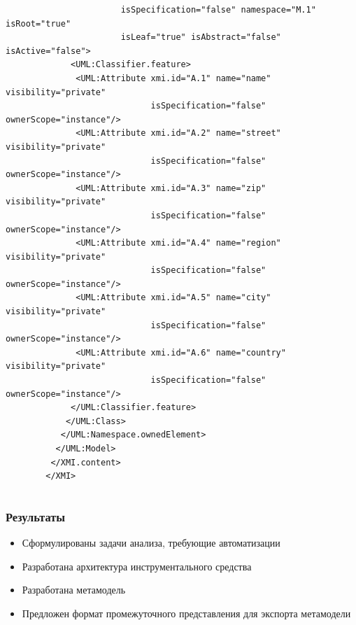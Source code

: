 \documentclass{beamer}
\begin{document}
\begin{frame}[fragile]
\begin{columns}
\begin{column}[c]{0.8\textwidth}
\begin{adjustbox}{width=0.8\textwidth,keepaspectratio}
\begin{lstlisting}
                       isSpecification="false" namespace="M.1" isRoot="true"
                       isLeaf="true" isAbstract="false" isActive="false">
             <UML:Classifier.feature>
              <UML:Attribute xmi.id="A.1" name="name" visibility="private"
                             isSpecification="false" ownerScope="instance"/>
              <UML:Attribute xmi.id="A.2" name="street" visibility="private"
                             isSpecification="false" ownerScope="instance"/>
              <UML:Attribute xmi.id="A.3" name="zip" visibility="private"
                             isSpecification="false" ownerScope="instance"/>
              <UML:Attribute xmi.id="A.4" name="region" visibility="private"
                             isSpecification="false" ownerScope="instance"/>
              <UML:Attribute xmi.id="A.5" name="city" visibility="private"
                             isSpecification="false" ownerScope="instance"/>
              <UML:Attribute xmi.id="A.6" name="country" visibility="private"
                             isSpecification="false" ownerScope="instance"/>
             </UML:Classifier.feature>
            </UML:Class>
           </UML:Namespace.ownedElement>
          </UML:Model>
         </XMI.content>
        </XMI>
        \end{lstlisting}
        \end{adjustbox}
    \end{column}
\end{columns}

\end{frame}
\begin{frame}
\frametitle{Результаты}

\begin{itemize}
    \item Сформулированы задачи анализа, требующие автоматизации
    \item Разработана архитектура инструментального средства
    \item Разработана метамодель
    \item Предложен формат промежуточного представления для экспорта метамодели
\end{itemize}
\end{frame}
\end{document}
